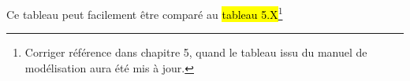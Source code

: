 \noindent Ce tableau peut facilement être comparé au \hl{tableau 5.X}\footnote{
	Corriger référence dans chapitre 5, quand le tableau issu du manuel de modélisation aura été mis à jour.
}
